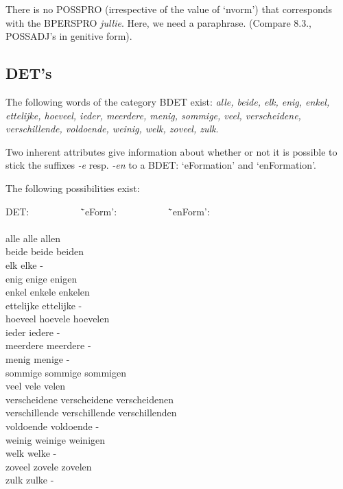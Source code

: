 There is no POSSPRO (irrespective of the value of `nvorm') that corresponds
with the BPERSPRO {\em jullie}. Here, we need a paraphrase. (Compare 8.3., 
POSSADJ's
in genitive form).


\subsection{DET's}

The following words of the category BDET exist: {\em alle,
beide, elk, enig, enkel, ettelijke, hoeveel, ieder, meerdere, menig, sommige,
veel, verscheidene, verschillende, voldoende, weinig, welk, zoveel, zulk}.

Two inherent attributes give 
information about whether or not it is possible to stick the suffixes {\em -e} 
resp. {\em -en} to a BDET: `eFormation' and `enFormation'.

The following possibilities exist:

\begin{tabbing}
DET: \ \ \ \ \ \ \ \ \ \  \= `eForm': \ \ \ \ \ \ \ \ \ \  \= `enForm': \\
                          \>                               \>           \\
alle         \>   alle          \>     allen              \\
beide        \>   beide         \>     beiden             \\
elk          \>   elke          \>     -                  \\
enig         \>   enige         \>     enigen             \\
enkel        \>   enkele        \>     enkelen            \\
ettelijke    \>   ettelijke     \>     -                  \\
hoeveel      \>   hoevele       \>     hoevelen           \\
ieder        \>   iedere        \>     -                  \\
meerdere     \>   meerdere      \>     -                  \\
menig        \>   menige        \>     -                  \\
sommige      \>   sommige       \>     sommigen           \\
veel         \>   vele          \>     velen              \\
verscheidene \>   verscheidene  \>     verscheidenen      \\
verschillende \>  verschillende \>     verschillenden     \\
voldoende    \>   voldoende     \>     -                  \\
weinig       \>   weinige       \>     weinigen           \\
welk         \>   welke         \>     -                  \\
zoveel       \>   zovele        \>     zovelen            \\
zulk         \>   zulke         \>     -                  \\
\end{tabbing}


